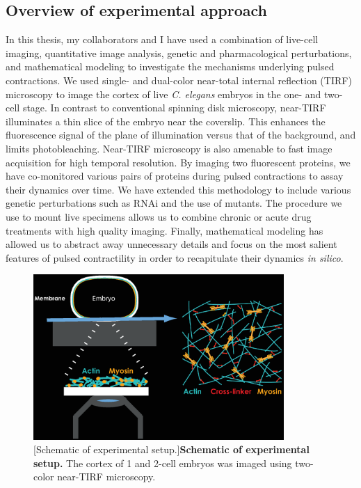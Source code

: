 \documentclass{ucetd}
\begin{document}
\subsection{Overview of experimental approach}
In this thesis, my collaborators and I have used a combination of live-cell imaging, quantitative image analysis, genetic and pharmacological perturbations, and mathematical modeling to investigate the mechanisms underlying pulsed contractions.  We used single- and dual-color near-total internal reflection (TIRF) microscopy to image the cortex of live \textit{C. elegans} embryos in the one- and two-cell stage.  In contrast to conventional spinning disk microscopy, near-TIRF illuminates a thin slice of the embryo near the coverslip.  This enhances the fluorescence signal of the plane of illumination versus that of the background, and limits photobleaching.  Near-TIRF microscopy is also amenable to fast image acquisition for high temporal resolution.  By imaging two fluorescent proteins, we have co-monitored various pairs of proteins during pulsed contractions to assay their dynamics over time.  We have extended this methodology to include various genetic perturbations such as RNAi and the use of mutants.  The procedure we use to mount live specimens allows us to combine chronic or acute drug treatments with high quality imaging.  Finally, mathematical modeling has allowed us to abstract away unnecessary details and focus on the most salient features of pulsed contractility in order to recapitulate their dynamics \textit{in silico}.

\begin{figure}[!htbp]
\centering
\includegraphics[width=0.85\textwidth]{Figure1-6}
[Schematic of experimental setup.]{\textbf{Schematic of experimental setup.} The cortex of 1 and 2-cell embryos was imaged using two-color near-TIRF microscopy.}
\end{figure}
\end{document}
